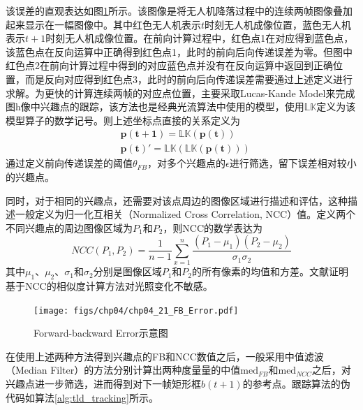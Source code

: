 该误差的直观表达如图\ref{fig:chp04_21_FB_Error}所示。该图像是将无人机降落过程中的连续两帧图像叠加起来显示在一幅图像中。其中红色无人机表示$t$时刻无人机成像位置，蓝色无人机表示$t+1$时刻无人机成像位置。在前向计算过程中，红色点1在对应得到蓝色点，该蓝色点在反向运算中正确得到红色点1，此时的前向后向传递误差为零。但图中红色点2在前向计算过程中得到的对应蓝色点并没有在反向运算中返回到正确位置，而是反向对应得到红色点3，此时的前向后向传递误差需要通过上述定义进行求解。为更快的计算连续两帧的对应点位置，主要采取Lucas-Kande Model\cite{lucas1981iterative}来完成图h像中兴趣点的跟踪，该方法也是经典光流算法中使用的模型，使用$\mathbb{LK}$定义为该模型算子的数学记号。则上述坐标点直接的关系定义为
\begin{align}
&\mathbf{p(t+1)} = \mathbb{LK}(\mathbf{p(t)}) \\
&\mathbf{p(t)}' = \mathbb{LK}(\mathbb{LK}(\mathbf{p(t)}))
\end{align}
通过定义前向传递误差的阈值$\theta_{FB}$，对多个兴趣点的$\epsilon$进行筛选，留下误差相对较小的兴趣点。

同时，对于相同的兴趣点，还需要对该点周边的图像区域进行描述和评估，这种描述一般定义为归一化互相关（Normalized Cross Correlation, NCC）值。定义两个不同兴趣点的周边图像区域为$P_1$和$P_2$，则NCC的数学表达为
\begin{equation}
NCC(P_1, P_2) = \frac{1}{n-1}\sum_{x=1}^{n}\frac{(P_1-\mu_1)(P_2-\mu_2)}{\sigma_1\sigma_2}
\end{equation}
其中$\mu_1$、$\mu_2$、$\sigma_1$和$\sigma_2$分别是图像区域$P_1$和$P_2$的所有像素的均值和方差。文献\cite{lewis1995fast}证明基于NCC的相似度计算方法对光照变化不敏感。

\begin{figure}[ht]   
	\centering
	\texttt{[image: figs/chp04/chp04\_21\_FB\_Error.pdf]}
	\caption{Forward-backward Error示意图}
	\label{fig:chp04_21_FB_Error}
\end{figure}

在使用上述两种方法得到兴趣点的FB和NCC数值之后，一般采用中值滤波（Median Filter）的方法分别计算出两种度量量的中值$\text{med}_{FB}$和$\text{med}_{NCC}$之后，对兴趣点进一步筛选，进而得到对下一帧矩形框$b(t+1)$的参考点。跟踪算法的伪代码如算法\ref{alg:tld_tracking}所示。

